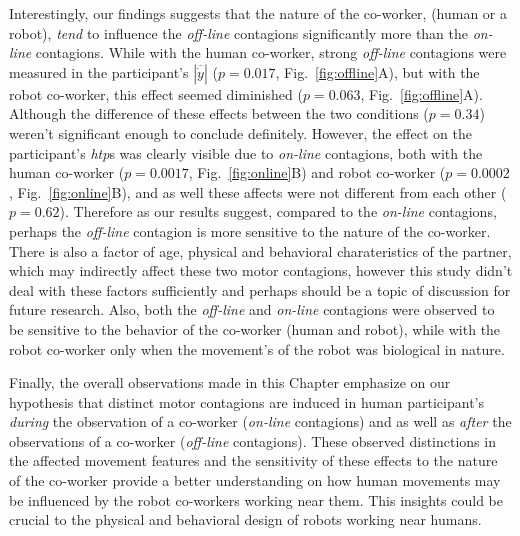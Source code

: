 Interestingly, our findings suggests that the nature of the co-worker, (human or a robot), \textit{tend} to influence the \textit{off-line} contagions significantly more than the \textit{on-line} contagions. While with the human co-worker, strong \textit{off-line} contagions were measured in the participant's $|\overline{\dot{y}}|$ ($p = 0.017$, Fig.~\ref{fig:offline}A), but with the robot co-worker, this effect seemed diminished ($p = 0.063$, Fig.~\ref{fig:offline}A). Although the difference of these effects between the two conditions ($p = 0.34$) weren't significant enough to conclude definitely. However, the effect on the participant's {\it htp}s was clearly visible due to \textit{on-line} contagions, both with the human co-worker ($p = 0.0017$, Fig.~\ref{fig:online}B) and robot co-worker ($p = 0.0002$, Fig.~\ref{fig:online}B), and as well these affects were not different from each other ($p = 0.62$). Therefore as our results suggest, compared to the \textit{on-line} contagions, perhaps the \textit{off-line} contagion is more sensitive to the nature of the co-worker. There is also a factor of age, physical and behavioral charateristics of the partner, which may indirectly affect these two motor contagions, however this study didn't deal with these factors sufficiently and perhaps should be a topic of discussion for future research. Also, both the \textit{off-line} and \textit{on-line} contagions were observed to be sensitive to the behavior of the co-worker (human and robot), while with the robot co-worker only when the movement's of the robot was biological in nature. 

Finally, the overall observations made in this Chapter emphasize on our hypothesis that distinct motor contagions are induced in human participant's \emph{during} the observation of a co-worker (\textit{on-line} contagions) and as well as \emph{after} the observations of a co-worker (\textit{off-line} contagions). These observed distinctions in the affected movement features and the sensitivity of these effects to the nature of the co-worker provide a better understanding on how human movements may be influenced by the robot co-workers working near them. This insights could be crucial to the physical and behavioral design of robots working near humans.

\clearpage